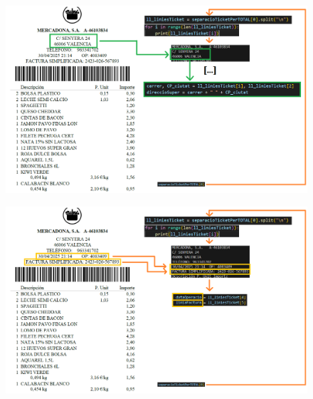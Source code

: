 \documentclass{beamer}
\begin{document}
		\begin{frame}
			\begin{figure}
				\centering
				\includegraphics[width=1\linewidth]{imgEspecifiques/ticketExtraccioH.png}
				\label{fig:ticketExtraccioH}
			\end{figure}
		\end{frame}
		
		
		\begin{frame}
			\begin{figure}
				\centering
				\includegraphics[width=1\linewidth]{imgEspecifiques/ticketExtraccioI.png}
				\label{fig:ticketExtraccioI}
			\end{figure}
		\end{frame}
		
\end{document}
